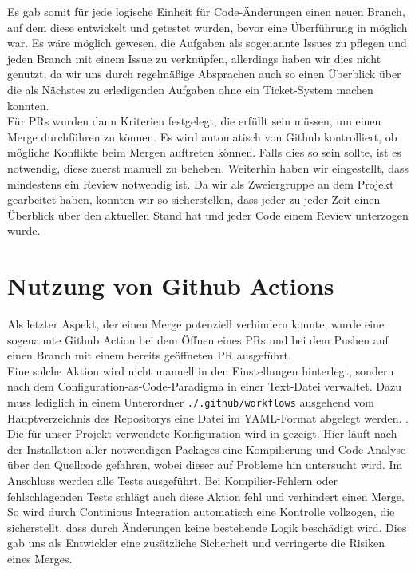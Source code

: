 Es gab somit für jede logische Einheit für Code-Änderungen einen neuen Branch, auf dem diese entwickelt und getestet
wurden, bevor eine Überführung in  möglich war.
Es wäre möglich gewesen, die Aufgaben als sogenannte Issues zu pflegen und jeden Branch mit einem Issue zu verknüpfen,
allerdings haben wir dies nicht genutzt, da wir uns durch regelmäßige Absprachen auch so einen Überblick über die
als Nächstes zu erledigenden Aufgaben ohne ein Ticket-System machen konnten. \\

Für \ac{PR}s wurden dann Kriterien festgelegt, die erfüllt sein müssen, um einen Merge durchführen zu können.
Es wird automatisch von Github kontrolliert, ob mögliche Konflikte beim Mergen auftreten können.
Falls dies so sein sollte, ist es notwendig, diese zuerst manuell zu beheben.
Weiterhin haben wir eingestellt, dass mindestens ein Review notwendig ist.
Da wir als Zweiergruppe an dem Projekt gearbeitet haben, konnten wir so sicherstellen, dass jeder zu jeder Zeit einen
Überblick über den aktuellen Stand hat und jeder Code einem Review unterzogen wurde.

\section{Nutzung von Github Actions}
\label{sec:github-actions}

Als letzter Aspekt, der einen Merge potenziell verhindern konnte, wurde eine sogenannte Github Action bei dem Öffnen
eines \ac{PR}s und bei dem Pushen auf einen Branch mit einem bereits geöffneten \ac{PR} ausgeführt. \\

Eine solche Aktion wird nicht manuell in den Einstellungen hinterlegt, sondern nach dem
Configuration-as-Code-Paradigma in einer Text-Datei verwaltet.
Dazu muss lediglich in einem Unterordner \texttt{./.github/workflows} ausgehend vom Hauptverzeichnis des Repositorys
eine Datei im YAML-Format abgelegt werden.  . \\

Die für unser Projekt verwendete Konfiguration wird in  gezeigt.
Hier läuft nach der Installation aller notwendigen Packages eine Kompilierung und Code-Analyse über den
Quellcode gefahren, wobei dieser auf Probleme hin untersucht wird.
Im Anschluss werden alle Tests ausgeführt.
Bei Kompilier-Fehlern oder fehlschlagenden Tests schlägt auch diese Aktion fehl und verhindert einen Merge. \\

So wird durch Continious Integration automatisch eine Kontrolle vollzogen, die sicherstellt, dass durch Änderungen
keine bestehende Logik beschädigt wird.
Dies gab uns als Entwickler eine zusätzliche Sicherheit und verringerte die Risiken eines Merges.
